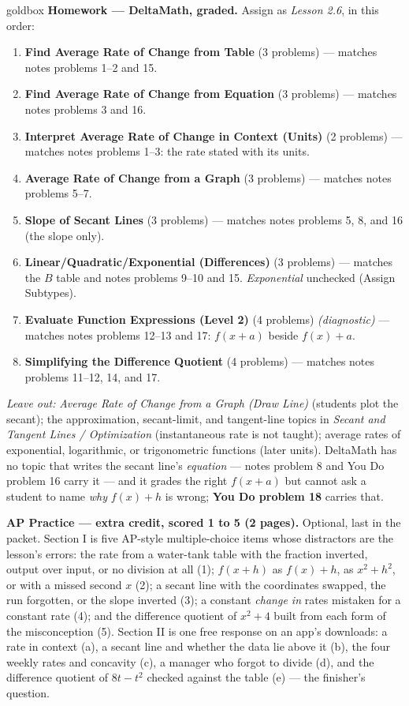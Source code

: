 \documentclass[10pt]{article}
\begin{document}
\begin{skillbox}{goldbox}
\textbf{Homework --- DeltaMath, graded.} Assign as \textit{Lesson 2.6}, in this order:
\begin{enumerate}[itemsep=1pt,topsep=2pt]
  \item \textbf{Find Average Rate of Change from Table} (3 problems) --- matches notes problems
        1--2 and 15.
  \item \textbf{Find Average Rate of Change from Equation} (3 problems) --- matches notes
        problems 3 and 16.
  \item \textbf{Interpret Average Rate of Change in Context (Units)} (2 problems) --- matches
        notes problems 1--3: the rate stated with its units.
  \item \textbf{Average Rate of Change from a Graph} (3 problems) --- matches notes problems
        5--7.
  \item \textbf{Slope of Secant Lines} (3 problems) --- matches notes problems 5, 8, and 16
        (the slope only).
  \item \textbf{Linear/Quadratic/Exponential (Differences)} (3 problems) --- matches the $B$
        table and notes problems 9--10 and 15. \textit{Exponential} unchecked (Assign Subtypes).
  \item \textbf{Evaluate Function Expressions (Level 2)} (4 problems) \textit{(diagnostic)} ---
        matches notes problems 12--13 and 17: $f(x + a)$ beside $f(x) + a$.
  \item \textbf{Simplifying the Difference Quotient} (4 problems) --- matches notes problems
        11--12, 14, and 17.
\end{enumerate}
\textit{Leave out:} \textit{Average Rate of Change from a Graph (Draw Line)} (students plot the
secant); the approximation, secant-limit, and tangent-line topics in \textit{Secant and Tangent
Lines / Optimization} (instantaneous rate is not taught); average rates of exponential,
logarithmic, or trigonometric functions (later units). DeltaMath has no topic that writes the
secant line's \emph{equation} --- notes problem 8 and You Do problem 16 carry it --- and it
grades the right $f(x + a)$ but cannot ask a student to name \emph{why} $f(x) + h$ is wrong;
\textbf{You Do problem 18} carries that.

\textbf{AP Practice --- extra credit, scored 1 to 5 (2 pages).} Optional, last in the packet.
Section I is five AP-style multiple-choice items whose distractors are the lesson's errors:
the rate from a water-tank table with the fraction inverted, output over input, or no division
at all (1); $f(x + h)$ as $f(x) + h$, as $x^2 + h^2$, or with a missed second $x$ (2); a secant
line with the coordinates swapped, the run forgotten, or the slope inverted (3); a constant
\emph{change in} rates mistaken for a constant rate (4); and the difference quotient of
$x^2 + 4$ built from each form of the misconception (5). Section II is one free response on an
app's downloads: a rate in context (a), a secant line and whether the data lie above it (b),
the four weekly rates and concavity (c), a manager who forgot to divide (d), and the
difference quotient of $8t - t^2$ checked against the table (e) --- the finisher's question.


\end{skillbox}
\end{document}
